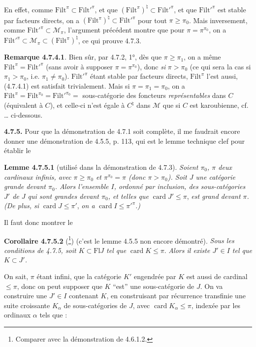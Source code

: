 \documentclass[11pt]{article}
\newcommand{\printedpage}[1]{\marginpar{\footnotesize p.~#1}}
\newcommand{\msp}[1]{\marginpar{\footnotesize [#1]}}
\newcommand{\Filt}{\mathrm{Filt}}
\newcommand{\card}{\operatorname{card}}
\begin{document}
En effet, comme $\Filt^{\pi} \subset \Filt'^{\pi}$, et que $(\Filt^{\pi})^{\natural} \subset \Filt'^{\pi}$, et que $\Filt'^{\pi}$ est stable par facteurs directs, on a $(\Filt^{\pi})^{\natural} \subset \Filt'^{\pi}$ pour tout $\pi \geqslant \pi_0$. Mais inversement, comme $\Filt'^{\pi} \subset \mathcal{M}_{\pi}$, l’argument précédent montre que pour $\pi = \pi^{\pi_0}$, on a $\Filt'^{\pi} \subset \mathcal{M}_{\pi} \subset (\Filt^{\pi})^{\natural}$, ce qui prouve 4.7.3.

\textbf{Remarque 4.7.4.1}. Bien sûr, par 4.7.2, 1°, dès que $\pi \geqslant \pi_1$, on a même $\Filt^{\pi} = \Filt'^{\pi}$ (sans avoir à supposer $\pi = \pi^{\pi_0}$), donc \textit{si} $\pi > \pi_0$ (ce qui sera la cas si $\pi_1 > \pi_0$, i.e. $\pi_1 \neq \pi_0$). $\Filt'^{\pi}$ étant stable par facteurs directs, $\Filt^{\pi}$ l’est aussi, (4.7.4.1) est satisfait trivialement. Mais si $\pi = \pi_1 = \pi_0$, on a $\Filt^{\pi} = \Filt^{\pi_0} = \Filt'^{\pi_0} =$ sous-catégorie des foncteurs \textit{représentables} dans $C$ (équivalent à $C$), et celle-ci n’est égale à $C^{\natural}$ dans $\mathcal{M}$ que si $C$ est karoubienne, cf. \ldots{} ci-dessous. %

\printedpage{56}

\msp{page 168}
\textbf{4.7.5.} Pour que la démonstration de 4.7.1 soit complète, il me faudrait encore donner une démonstration de 4.5.5, p. 113, qui est le lemme technique clef pour établir le

\textbf{Lemme 4.7.5.1} (utilisé dans la démonstration de 4.7.3). \textit{Soient $\pi_0$, $\pi$ deux cardinaux infinis, avec $\pi \geqslant \pi_0$ et $\pi^{\pi_0} = \pi$ (donc $\pi > \pi_0$). Soit $J$ une catégorie grande devant $\pi_0$. Alors l’ensemble $I$, ordonné par inclusion, des sous-catégories $J'$ de $J$ qui sont grandes devant $\pi_0$, et telles que} $\card J' \leqslant \pi$, \textit{est grand devant $\pi$. (De plus, si} $\card J \leqslant \pi'$, \textit{on a} $\card I \leqslant \pi'^{\pi}$\textit{.)}

Il faut donc montrer le

\textbf{Corollaire 4.7.5.2} (\footnote[70]{Comparer avec la démonstration de 4.6.1.2.}) (c’est le lemme 4.5.5 non encore démontré). \textit{Sous les conditions de 4.7.5, soit $K \subset \mathrm{Fl} J$ tel que} $\card K \leqslant \pi$. \textit{Alors il existe $J' \in I$ tel que $K \subset J'$.}

On sait, $\pi$ étant infini, que la catégorie $K'$ engendrée par $K$ est aussi de cardinal $\leqslant \pi$, donc on peut supposer que $K$ “est” une sous-catégorie de $J$. On va construire une $J' \in I$ contenant $K$, en construisant par récurrence transfinie une suite croissante $K_{\alpha}$ de sous-catégories de $J$, avec $\card K_{\alpha} \leqslant \pi$, indexée par les ordinaux $\alpha$ tels que \fbox{$\card \alpha \leqslant \pi$} :
\end{document}
